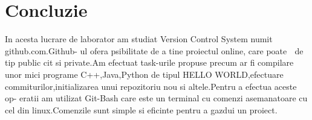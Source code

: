 \section*{Concluzie}
In acesta lucrare de laborator am studiat Version Control System numit github.com.Github-
ul ofera psibilitate de a tine proiectul online, care poate  de tip public cit si private.Am efectuat
task-urile propuse precum ar fi compilare unor mici programe C++,Java,Python de tipul HELLO
WORLD,efectuare commiturilor,initializarea unui repozitoriu nou si altele.Pentru a efectua aceste op-
eratii am utilizat Git-Bash care este un terminal cu comenzi asemanatoare cu cel din linux.Comenzile
sunt simple si eficinte pentru a gazdui un proiect.
\clearpage